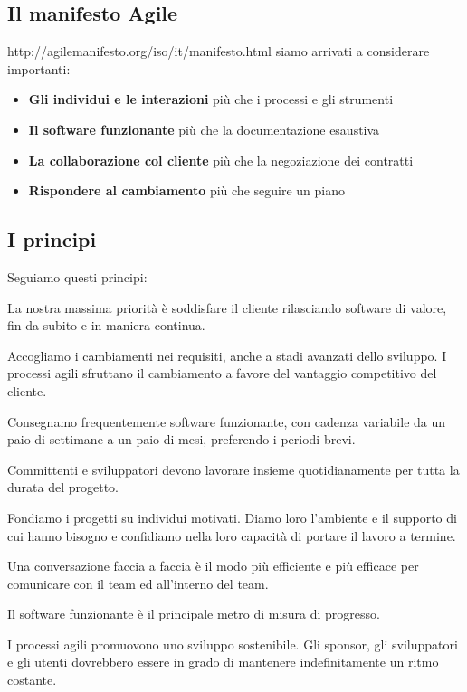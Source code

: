 \begin{itemize}
\section{Il manifesto Agile}
http://agilemanifesto.org/iso/it/manifesto.html
siamo arrivati a considerare importanti:
\begin{itemize}
	\item \textbf{Gli individui e le interazioni} più che i processi e gli strumenti\\
	\item \textbf{Il software funzionante} più che la documentazione esaustiva\\
	\item \textbf{La collaborazione col cliente} più che la negoziazione dei contratti\\
	\item \textbf{Rispondere al cambiamento} più che seguire un piano\\
\end{itemize}

\subsection{I principi}
Seguiamo questi principi:

La nostra massima priorità è soddisfare il cliente
rilasciando software di valore, fin da subito
e in maniera continua.

Accogliamo i cambiamenti nei requisiti,
anche a stadi avanzati dello sviluppo.
I processi agili sfruttano il cambiamento
a favore del vantaggio competitivo del cliente.

Consegnamo frequentemente software funzionante,
con cadenza variabile da un paio di settimane a un paio di mesi,
preferendo i periodi brevi.

Committenti e sviluppatori devono lavorare insieme
quotidianamente per tutta la durata del progetto.

Fondiamo i progetti su individui motivati.
Diamo loro l'ambiente e il supporto di cui hanno bisogno
e confidiamo nella loro capacità di portare il lavoro a termine.

Una conversazione faccia a faccia
è il modo più efficiente e più efficace per comunicare
con il team ed all'interno del team.

Il software funzionante è il principale metro di misura di progresso.

I processi agili promuovono uno sviluppo sostenibile.
Gli sponsor, gli sviluppatori e gli utenti dovrebbero essere in grado
di mantenere indefinitamente un ritmo costante.


\end{itemize}
